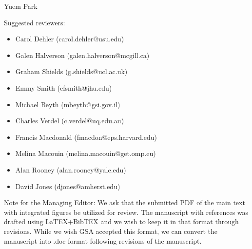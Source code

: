 \documentclass[11pt]{letter}
\begin{document}
Yuem Park

\vspace{1cm}

Suggested reviewers:

\begin{itemize}
\item Carol Dehler (carol.dehler@usu.edu)
\item Galen Halverson (galen.halverson@mcgill.ca)
\item Graham Shields (g.shields@ucl.ac.uk)
\item Emmy Smith (efsmith@jhu.edu)
\item Michael Beyth (mbeyth@gsi.gov.il)
\item Charles Verdel (c.verdel@uq.edu.au)
\item Francis Macdonald (fmacdon@eps.harvard.edu)
\item Melina Macouin (melina.macouin@get.omp.eu)
\item Alan Rooney (alan.rooney@yale.edu)
\item David Jones (djones@amherst.edu)
\end{itemize}

\vspace{1cm}

\footnotesize
Note for the Managing Editor: We ask that the submitted PDF of the main text with integrated figures be utilized for review. The manuscript with references was drafted using LaTEX+BibTEX and we wish to keep it in that format through revisions. While we wish GSA accepted this format, we can convert the manuscript into .doc format following revisions of the manuscript.
\end{document}
